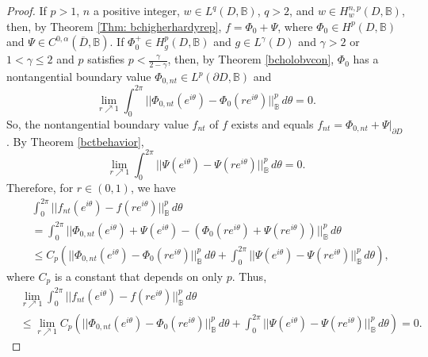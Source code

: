 \documentclass[suppldata]{interact}
\theoremstyle{plain}%
\theoremstyle{definition}
\theoremstyle{remark}
\newcommand{\p}{\partial}
\newcommand{\bc}{\mathbb{B}}
\begin{document}
\begin{proof}
If $p > 1$, $n$ a positive integer, $w \in L^q(D, \bc)$, $q>2$, and $w \in H^{n,p}_{w}(D, \bc)$, then, by Theorem \ref{Thm: bchigherhardyrep}, $f = \Phi_0 + \Psi$, where $\Phi_0 \in H^p(D,\bc)$ and $\Psi \in C^{0,\alpha}(\overline{D},\bc)$. If $\Phi_0^+ \in H^p_g(D,\bc)$ and $g \in L^\gamma(D)$ and $\gamma > 2$ or $1 < \gamma \leq 2$ and $p$ satisfies $p < \frac{\gamma}{2-\gamma}$, then, by Theorem \ref{bcholobvcon}, $\Phi_0$ has a nontangential boundary value $\Phi_{0,nt} \in L^p(\p D, \bc)$ and 
\[
        \lim_{r \nearrow 1} \int_0^{2\pi} ||\Phi_{0,nt}(e^{i\theta}) - \Phi_0(re^{i\theta}) ||^p_{\bc} \, d\theta  = 0. 
    \] 
So, the nontangential boundary value $f_{nt}$ of $f$ exists and equals $f_{nt} = \Phi_{0,nt} + \Psi|_{\p D}$. By Theorem \ref{bctbehavior},
\[
        \lim_{r \nearrow 1} \int_0^{2\pi} ||\Psi(e^{i\theta}) - \Psi(re^{i\theta}) ||^p_{\bc} \, d\theta  = 0. 
\]
Therefore, for $r \in (0,1)$, we have
\begin{align*}
    & \int_0^{2\pi} ||f_{nt}(e^{i\theta}) - f(re^{i\theta}) ||^p_{\bc} \, d\theta\\
    &= \int_0^{2\pi} ||\Phi_{0,nt}(e^{i\theta}) + \Psi(e^{i\theta}) - (\Phi_0(re^{i\theta}) + \Psi(re^{i\theta})) ||^p_{\bc} \, d\theta \\
    &\leq C_p \left( ||\Phi_{0,nt}(e^{i\theta}) - \Phi_0(re^{i\theta}) ||^p_{\bc} \, d\theta + \int_0^{2\pi} ||\Psi(e^{i\theta}) - \Psi(re^{i\theta}) ||^p_{\bc} \, d\theta \right),
\end{align*}
where $C_p$ is a constant that depends on only $p$. Thus, 
\begin{align*}
    &\lim_{r \nearrow 1} \int_0^{2\pi} ||f_{nt}(e^{i\theta}) - f(re^{i\theta}) ||^p_{\bc} \, d\theta \\
    &\leq \lim_{r \nearrow 1}C_p \left( ||\Phi_{0,nt}(e^{i\theta}) - \Phi_0(re^{i\theta}) ||^p_{\bc} \, d\theta + \int_0^{2\pi} ||\Psi(e^{i\theta}) - \Psi(re^{i\theta}) ||^p_{\bc} \, d\theta \right) = 0.
\end{align*}



\end{proof}
\end{document}
